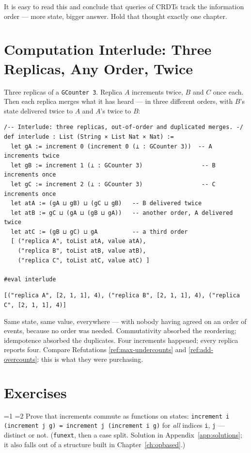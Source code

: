 \documentclass[12pt, a4paper, openright]{book}
\theoremstyle{thmstyle}
\theoremstyle{defstyle}
\newcommand{\lc}[1]{\texttt{#1}}
\newcounter{exercise}[chapter]
\renewcommand{\theexercise}{\thechapter.\arabic{exercise}}
\newenvironment{exercisebox}[1][]{%
  \refstepcounter{exercise}%
  \begin{tcolorbox}[exercisebox,
    title={Exercise \theexercise\ifx\\#1\\\else\ --- #1\fi}]%
}{\end{tcolorbox}}
\newcommand{\Stars}[1]{%
  \ifnum#1=1 \ding{72}\else\ifnum#1=2 \ding{72}\ding{72}\else
  \ding{72}\ding{72}\ding{72}\fi\fi\enspace}
\begin{document}
It is easy to read this and conclude that queries of CRDTs track the
information order --- more state, bigger answer. Hold that thought
exactly one chapter.

\FloatBarrier
\section{Computation Interlude: Three Replicas, Any Order, Twice}

Three replicas of a \lc{GCounter 3}. Replica $A$ increments twice, $B$
and $C$ once each. Then each replica merges what it has heard --- in
three different orders, with $B$'s state delivered twice to $A$ and
$A$'s twice to $B$:

\begin{verbatim}
/-- Interlude: three replicas, out-of-order and duplicated merges. -/
def interlude : List (String × List Nat × Nat) :=
  let gA := increment 0 (increment 0 (⊥ : GCounter 3))  -- A increments twice
  let gB := increment 1 (⊥ : GCounter 3)                 -- B increments once
  let gC := increment 2 (⊥ : GCounter 3)                 -- C increments once
  let atA := (gA ⊔ gB) ⊔ (gC ⊔ gB)   -- B delivered twice
  let atB := gC ⊔ (gA ⊔ (gB ⊔ gA))   -- another order, A delivered twice
  let atC := (gB ⊔ gC) ⊔ gA          -- a third order
  [ ("replica A", toList atA, value atA),
    ("replica B", toList atB, value atB),
    ("replica C", toList atC, value atC) ]

#eval interlude
\end{verbatim}

\begin{verbatim}
[("replica A", [2, 1, 1], 4), ("replica B", [2, 1, 1], 4), ("replica C", [2, 1, 1], 4)]
\end{verbatim}

Same state, same value, everywhere --- with nobody having agreed on an
order of events, because no order was needed. Commutativity absorbed the
reordering; idempotence absorbed the duplicates. Four increments
happened; every replica reports four. Compare Refutations
\ref{ref:max-undercounts} and \ref{ref:add-overcounts}: this is what
they were purchasing.

\section{Exercises}

\begin{exercisebox}[Increments commute]
  \label{ex:increment-comm}
  \Stars{1} Prove that increments commute as functions on states:
  \lc{increment i (increment j g) = increment j (increment i g)} for
  \emph{all} indices \lc{i}, \lc{j} --- distinct or not. (\lc{funext},
  then a case split. Solution in Appendix~\ref{app:solutions}; it also
  falls out of a structure built in Chapter~\ref{ch:opbased}.)
\end{exercisebox}
\end{document}
